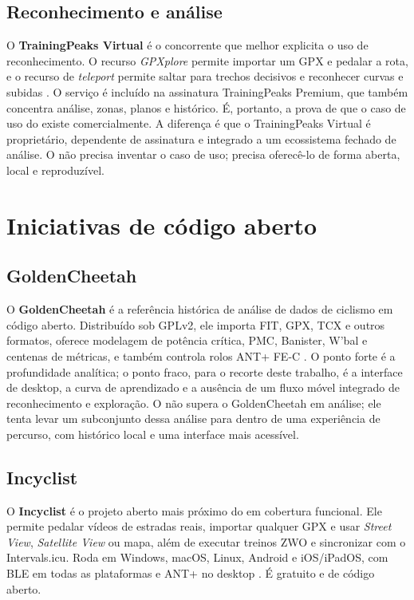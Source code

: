 \subsection{Reconhecimento e análise}
\label{sec:recon-e-analise}

O \textbf{TrainingPeaks Virtual} é o concorrente que melhor explicita o uso de
reconhecimento. O recurso \textit{GPXplore} permite importar um GPX e pedalar a
rota, e o recurso de \textit{teleport} permite saltar para trechos decisivos e
reconhecer curvas e subidas \cite{trainingpeaks_virtual}. O serviço é incluído
na assinatura TrainingPeaks Premium, que também concentra análise, zonas,
planos e histórico. É, portanto, a prova de que o caso de uso do \argus{} existe
comercialmente. A diferença é que o TrainingPeaks Virtual é proprietário,
dependente de assinatura e integrado a um ecossistema fechado de análise. O
\argus{} não precisa inventar o caso de uso; precisa oferecê-lo de forma
aberta, local e reproduzível.

\section{Iniciativas de código aberto}
\label{sec:codigo-aberto}

\subsection{GoldenCheetah}
\label{sec:goldencheetah}

O \textbf{GoldenCheetah} é a referência histórica de análise de dados de
ciclismo em código aberto. Distribuído sob GPLv2, ele importa FIT, GPX, TCX e
outros formatos, oferece modelagem de potência crítica, PMC, Banister, W'bal e
centenas de métricas, e também controla rolos ANT+ FE-C \cite{goldencheetah_site}.
O ponto forte é a profundidade analítica; o ponto fraco, para o recorte deste
trabalho, é a interface de desktop, a curva de aprendizado e a ausência de um
fluxo móvel integrado de reconhecimento e exploração. O \argus{} não supera o
GoldenCheetah em análise; ele tenta levar um subconjunto dessa análise para
dentro de uma experiência de percurso, com histórico local e uma interface mais
acessível.

\subsection{Incyclist}
\label{sec:incyclist}

O \textbf{Incyclist} é o projeto aberto mais próximo do \argus{} em cobertura
funcional. Ele permite pedalar vídeos de estradas reais, importar qualquer GPX
e usar \textit{Street View}, \textit{Satellite View} ou mapa, além de executar
treinos ZWO e sincronizar com o Intervals.icu. Roda em Windows, macOS, Linux,
Android e iOS/iPadOS, com BLE em todas as plataformas e ANT+ no desktop
\cite{incyclist_site}. É gratuito e de código aberto.


